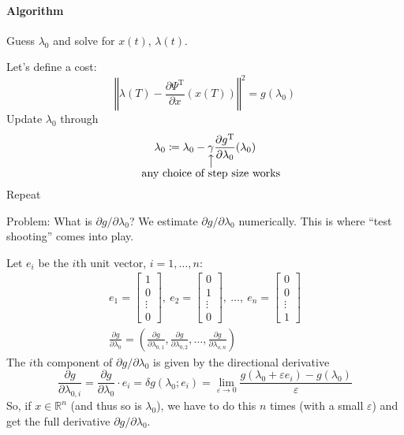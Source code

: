 \documentclass[letterpaper,12pt,titlepage]{report}
\newcommand{\trans}{^\text{T}}
\newcommand*\pder[2]{\frac{\partial #1}{\partial #2}}
\newcommand*\R{\mathbb{R}}
\theoremstyle{plain}
\theoremstyle{definition}
\begin{document}
\paragraph{Algorithm}
Guess $\lambda_0$ and solve for $x(t)$, $\lambda(t)$.
\begin{center}
\end{center}
Let's define a cost:
\[ \left\Vert \lambda(T) - \pder{\Psi\trans}{x}(x(T)) \right\Vert^2 = g(\lambda_0) \]
Update $\lambda_0$ through
\[ \lambda_0 \coloneqq \lambda_0 - \underset{\mathclap{\substack{\big\uparrow\\ \text{\normalsize any choice of step size works}}}}{\gamma} \pder{g\trans}{\lambda_0}(\lambda_0) \]
Repeat

\medskip

\noindent
Problem: What is $\partial g/\partial\lambda_0$? We estimate $\partial g/\partial\lambda_0$ numerically. This is where ``test shooting'' comes into play.

Let $e_i$ be the $i$th unit vector, $i=1,\dots,n$:
\begin{gather}
  e_1 = \begin{bmatrix}
    1 \\ 0 \\ \vdots \\ 0
  \end{bmatrix}\!,\ 
  e_2 = \begin{bmatrix}
    0 \\ 1 \\ \vdots \\ 0
  \end{bmatrix}\!,\ 
  \dots,\ 
  e_n = \begin{bmatrix}
    0 \\ 0 \\ \vdots \\ 1
  \end{bmatrix} \\
  \pder{g}{\lambda_0} = \left( \pder{g}{\lambda_{0,1}},\pder{g}{\lambda_{0,2}},\dots,\pder{g}{\lambda_{o,n}} \right)
\end{gather}
The $i$th component of $\partial g/\partial\lambda_0$ is given by the directional derivative
\[
  \pder{g}{\lambda_{0,i}} = \pder{g}{\lambda_0} \cdot e_i = \delta g(\lambda_0;e_i) = \lim_{\varepsilon\to0} \frac{g(\lambda_0+\varepsilon e_i) - g(\lambda_0)}{\varepsilon}
\]
So, if $x\in\R^n$ (and thus so is $\lambda_0$), we have to do this $n$ times (with a small $\varepsilon$) and get the full derivative $\partial g/\partial\lambda_0$.
\end{document}
